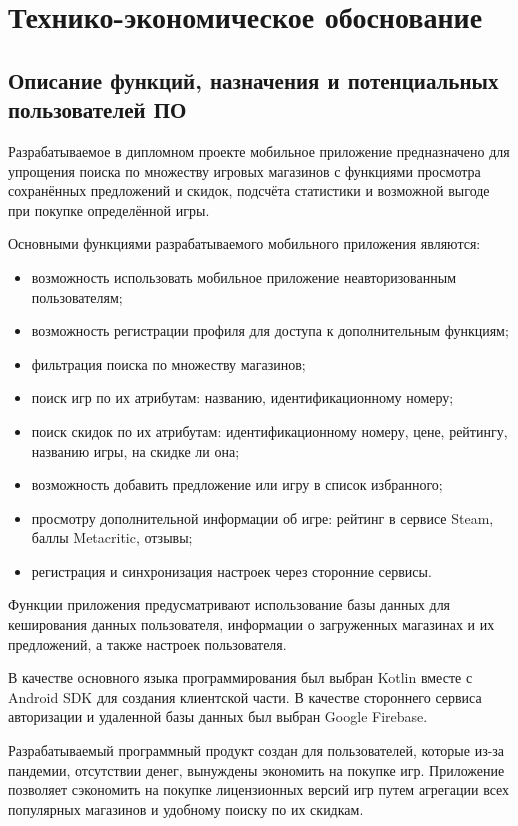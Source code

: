\newcommand{\byr}{Br}
\section{Технико-экономическое обоснование}
 
\subsection{Описание функций, назначения и потенциальных пользователей ПО}
Разрабатываемое в дипломном проекте мобильное приложение предназначено для упрощения поиска по множеству игровых магазинов с функциями просмотра сохранённых предложений и скидок, подсчёта статистики и возможной выгоде при покупке определённой игры.
 
Основными функциями разрабатываемого мобильного приложения являются:
\begin{itemize}
 \item возможность использовать мобильное приложение неавторизованным пользователям;
 \item возможность регистрации профиля для доступа к дополнительным функциям;
 \item фильтрация поиска по множеству магазинов;
 \item поиск игр по их атрибутам: названию, идентификационному номеру;
 \item поиск скидок по их атрибутам: идентификационному номеру, цене, рейтингу, названию игры, на скидке ли она;
 \item возможность добавить предложение или игру в список избранного;
 \item просмотру дополнительной информации об игре: рейтинг в сервисе Steam, баллы Metacritic, отзывы;
 \item регистрация и синхронизация настроек через сторонние сервисы.
\end{itemize}
 
Функции приложения предусматривают использование базы данных для кеширования данных пользователя, информации о загруженных магазинах и их предложений, а также настроек пользователя.
 
В качестве основного языка программирования был выбран Kotlin вместе с Android SDK для создания клиентской части. В качестве стороннего сервиса авторизации и удаленной базы данных был выбран Google Firebase.
 
Разрабатываемый программный продукт создан для пользователей, которые из-за пандемии, отсутствии денег, вынуждены экономить на покупке игр. Приложение позволяет сэкономить на покупке лицензионных версий игр путем агрегации всех популярных магазинов и удобному поиску по их скидкам.

